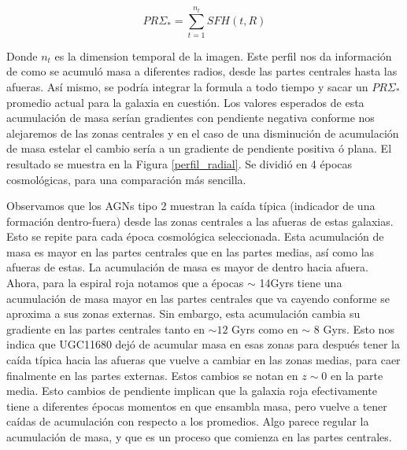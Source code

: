 \begin{equation}
PR \Sigma_{*}= \sum_{t=1}^{n_t} SFH(t,R)
\end{equation}



\noindent Donde $n_{t}$ es la dimension temporal de la imagen. Este perfil nos da información de como se acumuló masa a diferentes radios, desde las partes centrales hasta las afueras. Así mismo, se podría integrar la formula a todo tiempo y sacar un $PR \Sigma_{*}$ promedio actual para la galaxia en cuestión. Los valores esperados de esta acumulación de masa serían gradientes con pendiente negativa conforme nos alejaremos de las zonas centrales y en el caso de una disminución de acumulación de masa estelar el cambio sería a un gradiente de pendiente positiva ó plana. El resultado se muestra en la Figura \ref{perfil_radial}. Se dividió en 4 épocas cosmológicas, para una comparación más sencilla.

\bigskip

\noindent Observamos que los AGNs tipo 2 muestran la caída típica (indicador de una formación dentro-fuera) desde las zonas centrales a las afueras de estas galaxias. Esto se repite para cada época cosmológica seleccionada. Esta acumulación de masa es mayor en las partes centrales que en las partes medias, así como las afueras de estas. La acumulación de masa es mayor de dentro hacia afuera. Ahora, para la espiral roja notamos que a épocas $\sim$ 14Gyrs tiene una acumulación de masa mayor en las partes centrales que va cayendo conforme se aproxima a sus zonas externas. Sin embargo, esta acumulación cambia su gradiente en las partes centrales tanto en $\sim 12$ Gyrs como en $\sim$ 8 Gyrs. Esto nos indica que UGC11680 dejó de acumular masa en esas zonas para después tener la caída típica hacia las afueras que vuelve a cambiar en las zonas medias, para caer finalmente en las partes externas. Estos cambios se notan en $z \sim 0$ en la parte media. Esto cambios de pendiente implican que la galaxia roja efectivamente tiene a diferentes épocas momentos en que  ensambla masa, pero vuelve a tener caídas de acumulación con respecto a los promedios. Algo parece regular la acumulación de masa, y que es un proceso que comienza en las partes centrales.






